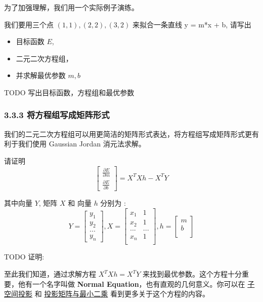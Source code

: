 \documentclass[11pt]{article}
\providecommand{\tightlist}{%
      \setlength{\itemsep}{0pt}\setlength{\parskip}{0pt}}
\begin{document}
为了加强理解，我们用一个实际例子演练。

我们要用三个点 \((1,1), (2,2), (3,2)\) 来拟合一条直线 y = m*x + b,
请写出

\begin{itemize}
\tightlist
\item
  目标函数 \(E\),
\item
  二元二次方程组，
\item
  并求解最优参数 \(m, b\)
\end{itemize}

    TODO 写出目标函数，方程组和最优参数

    \subsubsection{3.3.3
将方程组写成矩阵形式}\label{ux5c06ux65b9ux7a0bux7ec4ux5199ux6210ux77e9ux9635ux5f62ux5f0f}

我们的二元二次方程组可以用更简洁的矩阵形式表达，将方程组写成矩阵形式更有利于我们使用
Gaussian Jordan 消元法求解。

请证明 \[
\begin{bmatrix}
    \frac{\partial E}{\partial m} \\
    \frac{\partial E}{\partial b} 
\end{bmatrix} = X^TXh - X^TY
\]

其中向量 \(Y\), 矩阵 \(X\) 和 向量 \(h\) 分别为 : \[
Y =  \begin{bmatrix}
    y_1 \\
    y_2 \\
    ... \\
    y_n
\end{bmatrix}
,
X =  \begin{bmatrix}
    x_1 & 1 \\
    x_2 & 1\\
    ... & ...\\
    x_n & 1 \\
\end{bmatrix},
h =  \begin{bmatrix}
    m \\
    b \\
\end{bmatrix}
\]

    TODO 证明:

    至此我们知道，通过求解方程 \(X^TXh = X^TY\)
来找到最优参数。这个方程十分重要，他有一个名字叫做 \textbf{Normal
Equation}，也有直观的几何意义。你可以在
\href{http://open.163.com/movie/2010/11/J/U/M6V0BQC4M_M6V2AJLJU.html}{子空间投影}
和
\href{http://open.163.com/movie/2010/11/P/U/M6V0BQC4M_M6V2AOJPU.html}{投影矩阵与最小二乘}
看到更多关于这个方程的内容。
\end{document}
